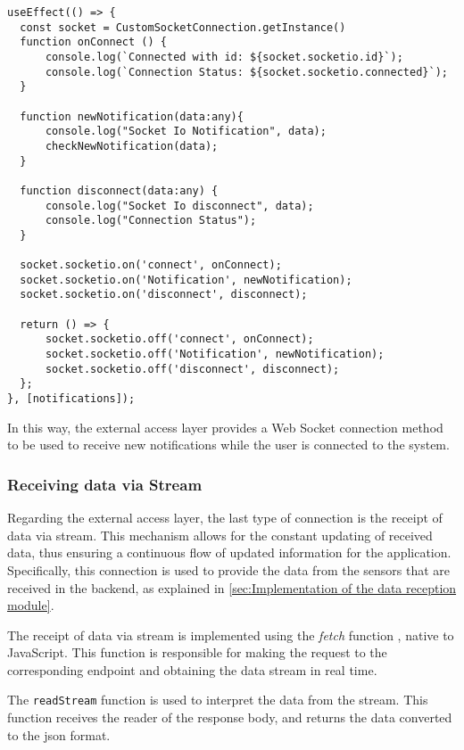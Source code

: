 \begin{verbatim}
useEffect(() => {
  const socket = CustomSocketConnection.getInstance()
  function onConnect () {
      console.log(`Connected with id: ${socket.socketio.id}`);
      console.log(`Connection Status: ${socket.socketio.connected}`);
  }

  function newNotification(data:any){
      console.log("Socket Io Notification", data);
      checkNewNotification(data);
  }

  function disconnect(data:any) {
      console.log("Socket Io disconnect", data);
      console.log("Connection Status");
  }

  socket.socketio.on('connect', onConnect);
  socket.socketio.on('Notification', newNotification);
  socket.socketio.on('disconnect', disconnect);

  return () => {
      socket.socketio.off('connect', onConnect);
      socket.socketio.off('Notification', newNotification);
      socket.socketio.off('disconnect', disconnect);
  };
}, [notifications]);
\end{verbatim}

In this way, the external access layer provides a Web Socket connection method to be used to receive new notifications while the user is connected to the system.

\subsubsection{Receiving data via Stream}\label{subsec:streamData}

Regarding the external access layer, the last type of connection is the receipt of data via stream. This mechanism allows for the constant updating of received data, thus ensuring a continuous flow of updated information for the application. Specifically, this connection is used to provide the data from the sensors that are received in the backend, as explained in \ref{sec:Implementation of the data reception module}.

The receipt of data via stream is implemented using the \textit{fetch} function \cite{mdnFetchAPI}, native to JavaScript. This function is responsible for making the request to the corresponding endpoint and obtaining the data stream in real time.

The \texttt{readStream} function is used to interpret the data from the stream. This function receives the reader of the response body, and returns the data converted to the \gls{json} format.

